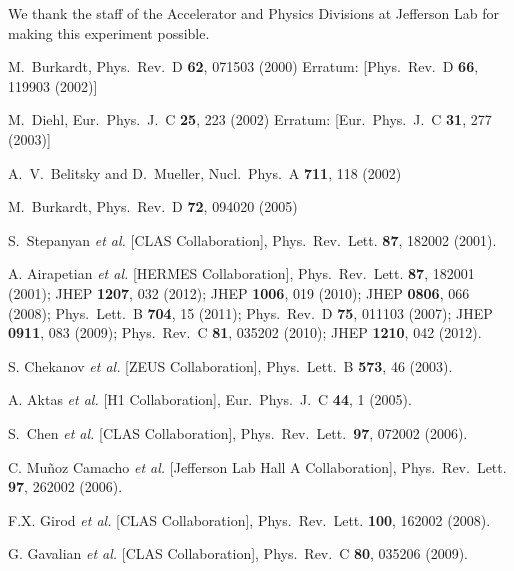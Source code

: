 \documentclass[nofootinbib,twocolumn,showpacs,prl,superscriptaddress,secnumarabic,amssymb,nobibnotes,aps,floatfix]{revtex4}
\begin{document}










We thank the staff of the Accelerator and Physics Divisions
at Jefferson Lab for making this experiment possible.

\begin{thebibliography}{99}

  M.~Burkardt,
  Phys.\ Rev.\ D {\bf 62}, 071503 (2000)
  Erratum: [Phys.\ Rev.\ D {\bf 66}, 119903 (2002)]

  M.~Diehl,
  Eur.\ Phys.\ J.\ C {\bf 25}, 223 (2002)
  Erratum: [Eur.\ Phys.\ J.\ C {\bf 31}, 277 (2003)]
 
  A.~V.~Belitsky and D.~Mueller,
  Nucl.\ Phys.\ A {\bf 711}, 118 (2002)

  M.~Burkardt,
  Phys.\ Rev.\ D {\bf 72}, 094020 (2005)

S.~Stepanyan {\it et al.} [CLAS Collaboration],
Phys.\ Rev.\ Lett. {\bf 87}, 182002 (2001).

A. Airapetian {\it et al.} [HERMES Collaboration],
Phys.\ Rev.\ Lett. {\bf 87}, 182001 (2001);
JHEP {\bf 1207}, 032 (2012);
JHEP {\bf 1006}, 019 (2010);
JHEP {\bf 0806}, 066 (2008);
Phys.\ Lett.\ B {\bf 704}, 15 (2011);
Phys.\ Rev.\  D {\bf 75}, 011103 (2007);
JHEP {\bf 0911}, 083 (2009);
Phys.\ Rev.\ C {\bf 81}, 035202 (2010);
JHEP {\bf 1210}, 042 (2012).

S. Chekanov {\it et al.} [ZEUS Collaboration],
Phys.\ Lett.\  B {\bf 573}, 46 (2003).

A. Aktas {\it et al.} [H1 Collaboration],
Eur.\ Phys.\ J.\ C {\bf 44}, 1 (2005).

S.~Chen {\it et al.} [CLAS Collaboration],
Phys.\ Rev.\ Lett.\ {\bf 97}, 072002 (2006).

C. Mu\~noz Camacho {\it et al.} [Jefferson Lab Hall A Collaboration],
Phys.\ Rev.\ Lett. {\bf 97}, 262002 (2006).

F.X. Girod {\it et al.} [CLAS Collaboration],
Phys.\ Rev.\ Lett. {\bf 100}, 162002 (2008).

G. Gavalian {\it et al.} [CLAS Collaboration],
Phys.\ Rev.\ C {\bf 80}, 035206 (2009).


\end{thebibliography}
\end{document}
